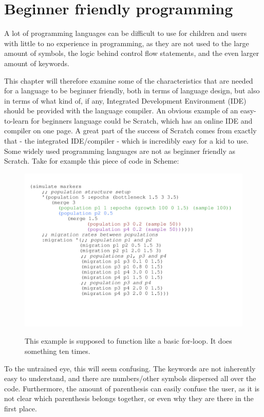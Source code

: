 \section{Beginner friendly programming}
A lot of programming languages can be difficult to use for children and users with little to no experience in programming, as they are not used to the large amount of symbols, the logic behind control flow statements, and the even larger amount of keywords.

This chapter will therefore examine some of the characteristics that are needed for a language to be beginner friendly, both in terms of language design, but also in terms of what kind of, if any, Integrated Development Environment (IDE) should be provided with the language compiler.
An obvious example of an easy-to-learn for beginners language could be Scratch\cite{scratch}, which has an online IDE and compiler on one page. A great part of the success of Scratch comes from exactly that - the integrated IDE/compiler - which is incredibly easy for a kid to use.
Some widely used programming languages are not as beginner friendly as Scratch. Take for example this piece of code in Scheme:
\begin{figure}[H]
    \centering
    \includegraphics{resources/Images/schemes***.png}
    \caption{This example is supposed to function like a basic for-loop. It does something ten times.}\cite{Schemeexample}\label{fig:schemestuff}
\end{figure}

To the untrained eye, this will seem confusing. The keywords are not inherently easy to understand, and there are numbers/other symbols dispersed all over the code. Furthermore, the amount of parenthesis can easily confuse the user, as it is not clear which parenthesis belongs together, or even why they are there in the first place.

